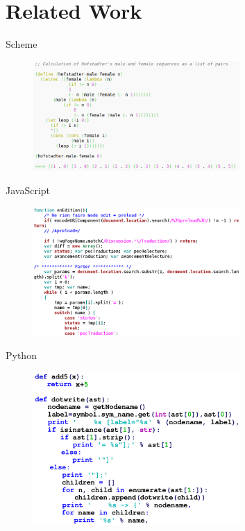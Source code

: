\documentclass[xcolor=dvipsnames]{beamer}
\begin{document}
\section{Related Work}
\begin{frame}{Scheme}
    \begin{figure}[htbp]
      \centering
      \includegraphics[width=0.7\textwidth]{img/SchemeCode.png}
      \label{fig:Scheme}
    \end{figure}
\end{frame}
\begin{frame}{JavaScript}
  \begin{figure}[htbp]
    \centering
    \includegraphics[width=0.7\textwidth]{img/JavaScriptCode.png}
    \label{fig:JavaScript}
  \end{figure}
\end{frame}
\begin{frame}{Python}
  \begin{figure}[htbp]
    \centering
    \includegraphics[width=0.7\textwidth]{img/pythonCode.png}
    \label{fig:Python}
  \end{figure}
\end{frame}
\end{document}
